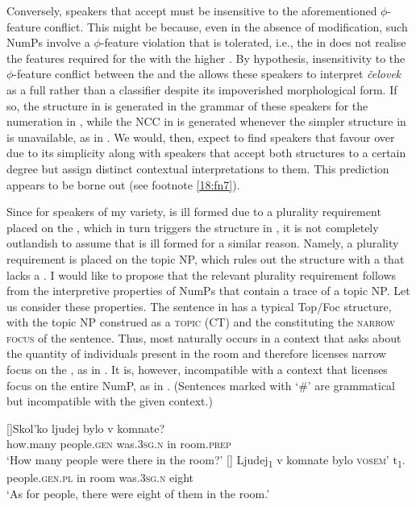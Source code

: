 \documentclass[output=paper,modfonts,newtxmath,hidelinks]{langscibook}
\begin{document}
Conversely, speakers that accept  must be insensitive to the aforementioned ${\phi}${}-feature conflict. This might be because, even in the absence of modification, such NumPs involve a ${\phi}${}-feature violation that is tolerated, i.e., the  in  does not realise the   features required for the  with the higher . By hypothesis, insensitivity to the ${\phi}${}-feature conflict between the  and the  allows these speakers to interpret \textit{čelovek} as a full  rather than a classifier despite its impoverished morphological form. If so, the structure in  is generated in the grammar of these speakers for the numeration in , while the NCC in  is generated whenever the simpler structure in  is unavailable, as in . We would, then, expect to find speakers that favour  over  due to its simplicity along with speakers that accept both structures to a certain degree but assign distinct contextual interpretations to them. This prediction appears to be borne out (see footnote \ref{18:fn7}).

\largerpage[2]
Since for speakers of my variety,  is ill formed due to a plurality requirement placed on the , which in turn triggers the structure in , it is not completely outlandish to assume that  is ill formed for a similar reason. Namely, a plurality requirement is placed on the topic NP, which rules out the structure with a  that lacks a  . I would like to propose that the relevant plurality requirement follows from the interpretive properties of NumPs that contain a trace of a topic NP. Let us consider these properties. The sentence in  has a typical Top/Foc structure, with the topic NP construed as a \textsc{ topic} (CT) and the  constituting the \textsc{narrow focus} of the sentence. Thus,  most naturally occurs in a context that asks about the quantity of individuals present in the room and therefore licenses narrow focus on the , as in . It is, however, incompatible with a context that licenses focus on the entire NumP, as in . (Sentences marked with ‘\#’ are grammatical but incompatible with the given context.)

\begin{exe} 
\ex \label{18:ex20}
\begin{xlist}
[]{\gll Skol’ko ljudej bylo v komnate?\\
how.many people.\textsc{gen} was.\textsc{3sg.n} in room.\textsc{prep}\\
	\glt `How many people were there in the room?'
    }
[]{ 
	\gll Ljudej\textsubscript{1}    v   komnate  bylo     \textsc{vosem’}   t\textsubscript{1}.\\
		 people.\textsc{gen.pl} in   room    was.\textsc{3sg.n}  eight  \\
	\glt `As for people, there were eight of them in the room.'
    }
\end{xlist}
\end{exe}
\end{document}

